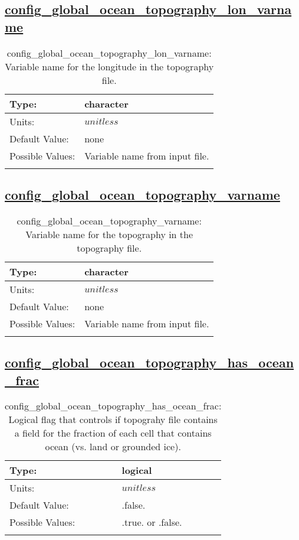 \subsection[config\_global\_ocean\_topography\_lon\_varname]{\hyperref[sec:nm_tab_global_ocean]{config\_global\_ocean\_topography\_lon\_varname}}
\label{subsec:nm_sec_config_global_ocean_topography_lon_varname}
\begin{center}
\begin{longtable}{| p{2.0in} || p{4.0in} |}
    \hline
    Type: & character \\
    \hline
    Units: & $unitless$ \\
    \hline
    Default Value: & none \\
    \hline
    Possible Values: & Variable name from input file. \\
    \hline
    \caption{config\_global\_ocean\_topography\_lon\_varname: Variable name for the longitude in the topography file.}
\end{longtable}
\end{center}
\subsection[config\_global\_ocean\_topography\_varname]{\hyperref[sec:nm_tab_global_ocean]{config\_global\_ocean\_topography\_varname}}
\label{subsec:nm_sec_config_global_ocean_topography_varname}
\begin{center}
\begin{longtable}{| p{2.0in} || p{4.0in} |}
    \hline
    Type: & character \\
    \hline
    Units: & $unitless$ \\
    \hline
    Default Value: & none \\
    \hline
    Possible Values: & Variable name from input file. \\
    \hline
    \caption{config\_global\_ocean\_topography\_varname: Variable name for the topography in the topography file.}
\end{longtable}
\end{center}
\subsection[config\_global\_ocean\_topography\_has\_ocean\_frac]{\hyperref[sec:nm_tab_global_ocean]{config\_global\_ocean\_topography\_has\_ocean\_frac}}
\label{subsec:nm_sec_config_global_ocean_topography_has_ocean_frac}
\begin{center}
\begin{longtable}{| p{2.0in} || p{4.0in} |}
    \hline
    Type: & logical \\
    \hline
    Units: & $unitless$ \\
    \hline
    Default Value: & .false. \\
    \hline
    Possible Values: & .true. or .false. \\
    \hline
    \caption{config\_global\_ocean\_topography\_has\_ocean\_frac: Logical flag that controls if topograhy file contains a field for the fraction of each cell that contains ocean (vs. land or grounded ice).}
\end{longtable}
\end{center}

